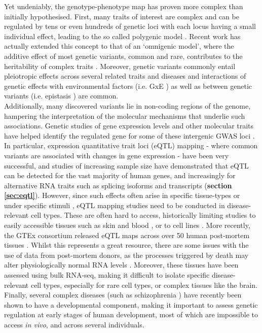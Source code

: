 Yet undeniably, the genotype-phenotype map has proven more complex than initially hypothesised. 
First, many traits of interest are complex and can be regulated by tens or even hundreds of genetic loci with each locus having a small individual effect, leading to the so called polygenic model \cite{wood2014defining, loh2015contrasting, shi2016contrasting}.
Recent work has actually extended this concept to that of an `omnigenic model', where the additive effect of most genetic variants, common and rare,  contributes to the heritability of complex traits \cite{boyle2017expanded}.
Moreover, genetic variants commonly entail pleiotropic effects across several related traits and diseases \cite{pickrell2016detection, visscher2016plethora} and interactions of genetic effects with environmental factors (i.e. GxE \cite{garcia2005nat2, thomas2010gene}) as well as between genetic variants (i.e. epistasis \cite{wei2014detecting}) are common. \\

Additionally, many discovered variants lie in non-coding regions of the genome, hampering the interpretation of the molecular mechanisms that underlie such associations. 
Genetic studies of gene expression levels and other molecular traits have helped identify the regulated gene for some of these intergenic GWAS loci \cite{schadt2008mapping}.
In particular, expression quantitative trait loci (eQTL) mapping - where common variants are associated with changes in gene expression - have been very successful, and studies of increasing sample size have demonstrated that eQTL can be detected for the vast majority of human genes, and increasingly for alternative RNA traits such as splicing isoforms and transcripts (\textbf{section 
\ref{sec:eqtl}}). 
However, since such effects often arise in specific tissue-types or under specific stimuli \cite{alasoo2018shared}, eQTL mapping studies need to be conducted in disease-relevant cell types. 
These are often hard to access, historically limiting studies to easily accessible tissues such as skin and blood \cite{fairfax2014innate, westra2014genome}, or to cell lines \cite{gibson2005quantitative}.
More recently, the GTEx consortium released eQTL maps across over 50 human post-mortem tissues \cite{aguet2019gtex}.
Whilst this represents a great resource, there are some issues with the use of data from post-mortem donors, as the processes triggered by death may alter physiologically normal RNA levels \cite{ferreira2018effects}.
Moreover, these tissues have been assessed using bulk RNA-seq, making it difficult to isolate specific disease-relevant cell types, especially for rare cell types, or complex tissues like the brain.
Finally, several complex diseases (such as schizophrenia \cite{owen2011neurodevelopmental}) have recently been shown to have a developmental component, making it important to assess genetic regulation at early stages of human development, most of which are impossible to access \textit{in vivo}, and across several individuals.\\

